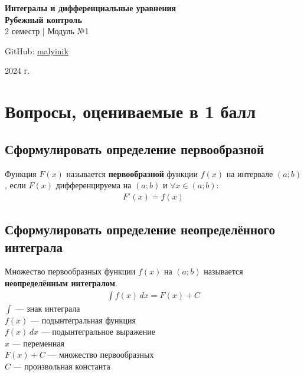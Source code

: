 



\begin{titlepage}
    \vspace*{0pt}
    \vfill
    \centering
    \Huge\textbf{Интегралы и дифференциальные уравнения} \\[7pt]
    \Large\textbf{Рубежный контроль} \\
    \large 2 семестр | Модуль №1 \\ 
    \vfill
    \begin{flushright}
        \normalsize GitHub: \href{https://github.com/malyinik}{malyinik} \\
    \end{flushright}
    \normalsize 2024 г.
\end{titlepage}
\newpage

\tableofcontents
\newpage

\section{Вопросы, оцениваемые в 1 балл}

\subsection{Сформулировать определение первообразной}

\begin{definition}
    Функция $F(x)$ называется \textbf{первообразной} функции $f(x)$ на интервале $(a;b)$, если $F(x)$ дифференцируема на $(a;b)$ и $\forall x \in (a;b)\colon$
    \begin{gather}
        \boxed{F'(x) = f(x)}
    \end{gather}
\end{definition}

\subsection{Сформулировать определение неопределённого интеграла}

\begin{definition}
    Множество первообразных функции $f(x)$ на $(a;b)$ называется \textbf{неопределённым интегралом}.
    \begin{gather}
        \boxed{\int f(x)\, dx = F(x) + C}
    \end{gather}
    $\int$ --- знак интеграла\\
    $f(x)$ --- подынтегральная функция\\
    $f(x)\, dx$ --- подынтегральное выражение\\
    $x$ --- переменная\\
    $F(x) + C$ --- множество первообразных\\
    $C$ --- произвольная константа
\end{definition}


